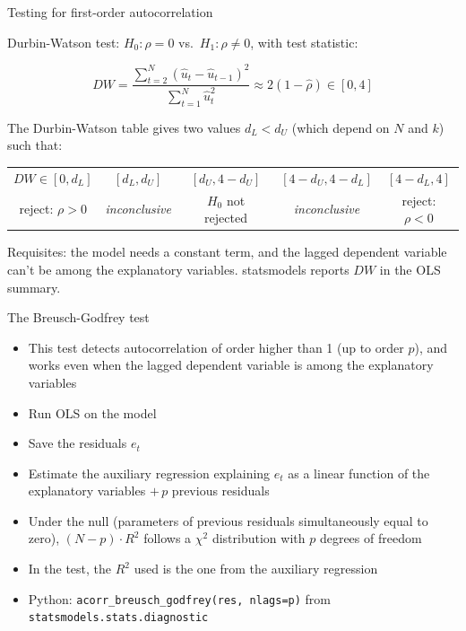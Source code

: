 \documentclass[aspectratio=169]{beamer}
\begin{document}
\begin{frame}{Testing for first-order autocorrelation}

Durbin-Watson test: $H_0: \rho = 0$ vs.\ $H_1: \rho \neq 0$, with test statistic:

\[
DW = \frac{\sum_{t=2}^{N}(\hat{u}_t - \hat{u}_{t-1})^2}{\sum_{t=1}^{N}\hat{u}_t^2} \approx 2(1 - \hat{\rho}) \in [0, 4]
\]

The Durbin-Watson table gives two values $d_L < d_U$ (which depend on $N$ and $k$) such that:

\begin{center}
\small
\begin{tabular}{ccccc}
$DW \in [0, d_L]$ & $[d_L, d_U]$ & $[d_U, 4-d_U]$ & $[4-d_U, 4-d_L]$ & $[4-d_L, 4]$\\
reject: $\rho > 0$ & \textit{inconclusive} & $H_0$ not rejected & \textit{inconclusive} & reject: $\rho < 0$
\end{tabular}
\end{center}

Requisites: the model needs a constant term, and the lagged dependent variable can't be among the explanatory variables. statsmodels reports $DW$ in the OLS summary.

\end{frame}

\begin{frame}{The Breusch-Godfrey test}

\begin{itemize}
    \item This test detects autocorrelation of order higher than 1 (up to order $p$), and works even when the lagged dependent variable is among the explanatory variables
    \item Run OLS on the model
    \item Save the residuals $e_t$
    \item Estimate the auxiliary regression explaining $e_t$ as a linear function of the explanatory variables $+ \, p$ previous residuals
    \item Under the null (parameters of previous residuals simultaneously equal to zero), $(N-p) \cdot R^2$ follows a $\chi^2$ distribution with $p$ degrees of freedom
    \item In the test, the $R^2$ used is the one from the auxiliary regression
    \item Python: \texttt{acorr\_breusch\_godfrey(res, nlags=p)} from \texttt{statsmodels.stats.diagnostic}
\end{itemize}

\end{frame}
\end{document}
